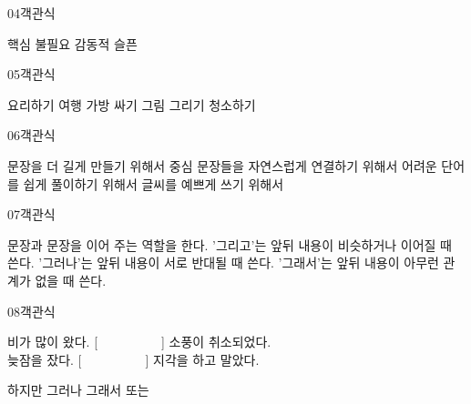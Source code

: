 \documentclass[fs11,seriesFre]{korfarm-base}
\begin{document}
\begin{kfQBlock}{04}{객관식}
\begin{kfChoices}
\kfChoice 핵심
\kfChoice 불필요
\kfChoice 감동적
\kfChoice 슬픈
\end{kfChoices}
\end{kfQBlock}

\begin{kfQBlock}{05}{객관식}
\begin{kfChoices}
\kfChoice 요리하기
\kfChoice 여행 가방 싸기
\kfChoice 그림 그리기
\kfChoice 청소하기
\end{kfChoices}
\end{kfQBlock}

\begin{kfQBlock}{06}{객관식}
\begin{kfChoices}
\kfChoice 문장을 더 길게 만들기 위해서
\kfChoice 중심 문장들을 자연스럽게 연결하기 위해서
\kfChoice 어려운 단어를 쉽게 풀이하기 위해서
\kfChoice 글씨를 예쁘게 쓰기 위해서
\end{kfChoices}
\end{kfQBlock}

\begin{kfQBlock}{07}{객관식}
\begin{kfChoices}
\kfChoice 문장과 문장을 이어 주는 역할을 한다.
\kfChoice '그리고'는 앞뒤 내용이 비슷하거나 이어질 때 쓴다.
\kfChoice '그러나'는 앞뒤 내용이 서로 반대될 때 쓴다.
\kfChoice '그래서'는 앞뒤 내용이 아무런 관계가 없을 때 쓴다.
\end{kfChoices}
\end{kfQBlock}

\begin{kfQBlock}{08}{객관식}
\begin{kfEvidence}비가 많이 왔다. [　　　　　] 소풍이 취소되었다. \\\relax
늦잠을 잤다. [　　　　　] 지각을 하고 말았다.\end{kfEvidence}
\begin{kfChoices}
\kfChoice 하지만
\kfChoice 그러나
\kfChoice 그래서
\kfChoice 또는
\end{kfChoices}
\end{kfQBlock}
\end{document}
